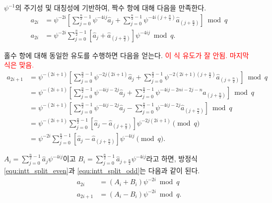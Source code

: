 $\psi^{-1}$의 주기성 및 대칭성에 기반하여, 짝수 항에 대해 다음을 만족한다.
\begin{equation}
\label{equ:intt_split_even}
\begin{split}
a_{2i} &= \psi^{-2i} \left[ \sum_{j=0}^{\frac{n}{2}-1} \psi^{-4ij}\hat{a}_j + \sum_{j=0}^{\frac{n}{2}-1} \psi^{-4i(j+\frac{n}{2})}\hat{a}_{(j+\frac{n}{2})} \right] \bmod q \\
a_{2i} &= \psi^{-2i} \sum_{j=0}^{\frac{n}{2}-1} \left[ \hat{a}_j + \hat{a}_{(j+\frac{n}{2})} \right] \psi^{-4ij} \bmod q.
\end{split}
\end{equation}

홀수 항에 대해 동일한 유도를 수행하면 다음을 얻는다. \textcolor{red}{이 식 유도가 잘 안됨. 마지막 식은 맞음.}
\begin{equation}
\label{equ:intt_split_odd}
\begin{split}
a_{2i+1} &= \psi^{-(2i+1)} \left[ \sum_{j=0}^{\frac{n}{2}-1} \psi^{-2j(2i+1)}\hat{a}_j + \sum_{j=0}^{\frac{n}{2}-1} \psi^{-2(2i+1)(j+\frac{n}{2})}\hat{a}_{(j+\frac{n}{2})} \right] \bmod q \\
&= \psi^{-(2i+1)} \left[ \sum_{j=0}^{\frac{n}{2}-1} \psi^{-4ij-2j}\hat{a}_j + \sum_{j=0}^{\frac{n}{2}-1} \psi^{-4ij-2ni-2j-n}\hat{a}_{(j+\frac{n}{2})} \right] \bmod q \\
&= \psi^{-(2i+1)} \left[ \sum_{j=0}^{\frac{n}{2}-1} \psi^{-4ij-2j}\hat{a}_j - \sum_{j=0}^{\frac{n}{2}-1} \psi^{-4ij-2j}\hat{a}_{(j+\frac{n}{2})} \right] \bmod q \\
&= \psi^{-(2i+1)} \sum_{j=0}^{\frac{n}{2}-1} \left[ \hat{a}_j - \hat{a}_{(j+\frac{n}{2})} \right] \psi^{-2j(2i+1)} \pmod q \\
&= \psi^{-2i} \sum_{j=0}^{\frac{n}{2}-1} \left[ \hat{a}_j - \hat{a}_{(j+\frac{n}{2})} \right] \psi^{-4ij} \pmod q.
\end{split}
\end{equation}

$A_i = \sum_{j=0}^{\frac{n}{2}-1} \hat{a}_j \psi^{-4ij}$이고 $B_i = \sum_{j=0}^{\frac{n}{2}-1} \hat{a}_{j+\frac{n}{2}} \psi^{-4ij}$라고 하면, 방정식 \ref{equ:intt_split_even}과 \ref{equ:intt_split_odd}는 다음과 같이 된다.
\begin{equation}
\label{equ:intt_split_butterfly}
\begin{split}
a_{2i} &= (A_i + B_i)\psi^{-2i} \bmod q \\
a_{2i+1} &= (A_i - B_i)\psi^{-2i} \bmod q.
\end{split}
\end{equation}

